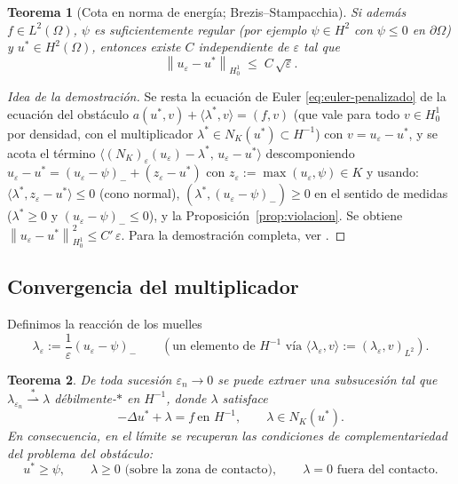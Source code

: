 \documentclass[11pt,a4paper]{article}
\newtheorem{teorema}{Teorema}[section]
\theoremstyle{definition}
\theoremstyle{remark}
\newcommand{\Norm}[1]{\left\lVert #1 \right\rVert}
\begin{document}
\begin{teorema}[Cota en norma de energía; Brezis--Stampacchia]
\label{thm:BS}
Si además $f \in L^2(\Omega)$, $\psi$ es suficientemente regular
(por ejemplo $\psi \in H^2$ con $\psi \le 0$ en $\partial\Omega$) y
$u^\ast \in H^2(\Omega)$, entonces existe $C$ independiente de
$\varepsilon$ tal que
\[
\Norm{u_\varepsilon - u^\ast}_{H^1_0} \;\le\; C\,\sqrt{\varepsilon}.
\]
\end{teorema}

\begin{proof}[Idea de la demostración]
Se resta la ecuación de Euler \eqref{eq:euler-penalizado} de la ecuación del
obstáculo $a(u^\ast, v) + \langle \lambda^\ast, v\rangle = (f, v)$
(que vale para todo $v \in H^1_0$ por densidad, con el multiplicador
$\lambda^\ast \in N_K(u^\ast) \subset H^{-1}$) con $v = u_\varepsilon -
u^\ast$, y se acota el término
$\langle (N_K)_\varepsilon(u_\varepsilon) - \lambda^\ast,\,
u_\varepsilon - u^\ast\rangle$ descomponiendo
$u_\varepsilon - u^\ast = (u_\varepsilon - \psi)_- + (z_\varepsilon - u^\ast)$
con $z_\varepsilon := \max(u_\varepsilon, \psi) \in K$ y usando:
$\langle \lambda^\ast, z_\varepsilon - u^\ast\rangle \le 0$ (cono normal),
$(\lambda^\ast, (u_\varepsilon - \psi)_-) \ge 0$ en el sentido de medidas
($\lambda^\ast \ge 0$ y $(u_\varepsilon-\psi)_- \le 0$), y la
Proposición~\ref{prop:violacion}. Se obtiene
$\Norm{u_\varepsilon - u^\ast}_{H^1_0}^2 \le C'\, \varepsilon$.
Para la demostración completa, ver \cite{BS68, Glowinski}.
\end{proof}

\subsection{Convergencia del multiplicador}

Definimos la reacción de los muelles
\[
\lambda_\varepsilon := \frac{1}{\varepsilon}(u_\varepsilon - \psi)_-
\qquad (\text{un elemento de } H^{-1} \text{ vía }
\langle \lambda_\varepsilon, v\rangle := (\lambda_\varepsilon, v)_{L^2}).
\]

\begin{teorema}\label{thm:multiplicador}
De toda sucesión $\varepsilon_n \to 0$ se puede extraer una subsucesión tal
que $\lambda_{\varepsilon_n} \overset{\ast}{\rightharpoonup} \lambda$
débilmente-$\ast$ en $H^{-1}$, donde $\lambda$ satisface
\[
-\Delta u^\ast + \lambda = f \ \text{en } H^{-1},
\qquad
\lambda \in N_K(u^\ast).
\]
En consecuencia, en el límite se recuperan las condiciones de
complementariedad del problema del obstáculo:
\[
u^\ast \ge \psi, \qquad \lambda \ge 0 \text{ (sobre la zona de contacto)},
\qquad \lambda = 0 \text{ fuera del contacto}.
\]
\end{teorema}
\end{document}

